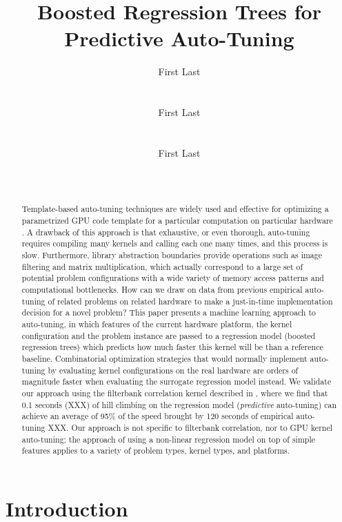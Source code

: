 \documentclass{sig-alternate}
\title{Boosted Regression Trees for Predictive Auto-Tuning}
\author{
\alignauthor First Last\\
\affaddr{Affiliation line 1}\\
\affaddr{Affiliation line 2}\\
\email{anon@mail.com}
\alignauthor First Last\\
\affaddr{Affiliation line 1}\\
\affaddr{Affiliation line 2}\\
\email{anon@mail.com}
\alignauthor First Last\\
\affaddr{Affiliation line 1}\\
\affaddr{Affiliation line 2}\\
\email{anon@mail.com}
}
\begin{document}
\maketitle

\begin{abstract}
Template-based auto-tuning techniques are widely used and effective for optimizing a
parametrized GPU code template for a particular computation on particular
hardware \cite{XXXX}.  A drawback of this approach is that exhaustive, or even thorough, auto-tuning requires
compiling many kernels and calling each one many times, and this process is slow.
Furthermore, library abstraction boundaries provide operations such as image
filtering and matrix multiplication, which actually correspond to a large set
of potential problem configurations with a wide variety of memory access
patterns and computational bottlenecks.  How can we draw on data from previous
empirical auto-tuning of related problems on related hardware to make a
just-in-time implementation decision for a novel problem?  This paper presents
a machine learning approach to auto-tuning, in which features of the
current hardware platform, the kernel configuration and the problem
instance are passed to a regression model (boosted regression trees) which
predicts how much faster this kernel will be than a reference baseline.
Combinatorial optimization strategies that would normally implement auto-tuning
by evaluating kernel configurations on the real hardware are orders of
magnitude faster when evaluating the surrogate regression model instead.  We
validate our approach using the filterbank correlation kernel described in
\citet{pinto+cox:2011gcg}, where we find that 0.1 seconds (XXX) of hill
climbing on the regression model ({\em predictive} auto-tuning) can achieve an
average of 95\% of the speed brought by 120 seconds of empirical auto-tuning
XXX.  Our approach is not specific to filterbank correlation, nor to GPU
kernel auto-tuning; the approach of using a non-linear regression model on top
of simple features applies to a variety of problem types, kernel types, and
platforms.  \end{abstract}

\section{Introduction}


\end{document}
